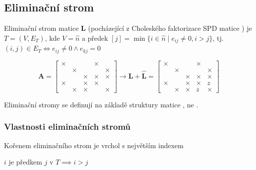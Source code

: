 \documentclass[../main.tex]{subfiles}
\begin{document}
\subsection{Eliminační strom}

Eliminační strom matice $\mathbf{L}$ 
(pocházející z Choleského faktorizace SPD matice \matAsquare) 
je $T = (V, E_T)$, kde $V=\hat{n}$ a předek $[j] = \min \{i\in\hat{n} \mid e_{ij} \neq 0, i>j \}$, tj. 
$(i,j) \in E_T \Leftrightarrow e_{ij} \neq 0 \wedge e_{kj} = 0$

\begin{equation*}
    \mathbf{A} = \begin{bmatrix}
        \times &  &  & \times &  \\
         & \times &  &  & \times \\
         &  & \times & \times & \times \\
        \times &  & \times & \times &  \\
         & \times & \times &  & \times 
        \end{bmatrix}  \rightarrow
        \mathbf{L} + \hat{\mathbf{L}} = 
        \begin{bmatrix}
            \times &  &  & \times &  \\
             & \times &  &  & \times \\
             &  & \times & \times & \times \\
            \times &  & \times & \times & z \\
             & \times & \times & z & \times 
            \end{bmatrix} 
\end{equation*}

Eliminační stromy se definují na základě struktury matice \matL , ne \matA . 

\subsubsection{Vlastnosti eliminačních stromů}
\begin{claim}
Kořenem eliminačního strom je vrchol s největším indexem
\end{claim}

\begin{claim}
$i$ je předkem $j$ v $T \implies i> j $
\end{claim}
\end{document}
